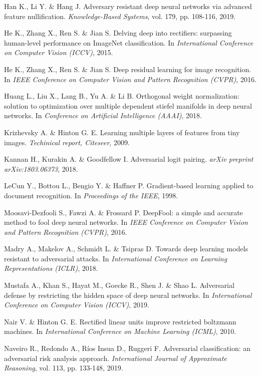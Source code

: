 \documentclass[preprint,review,12pt]{elsarticle}
\numberwithin{equation}{section}
\begin{document}
\begin{thebibliography}{99}
Han K., Li Y. \& Hang J.
Adversary resistant deep neural networks via advanced feature nullification.
\textit{Knowledge-Based Systems}, vol. 179, pp. 108-116, 2019.

He K., Zhang X., Ren S. \&  Jian S.
Delving deep into rectifiers: surpassing human-level performance on ImageNet classification.
In \textit{International Conference on Computer Vision (ICCV)}, 2015.

He K., Zhang X., Ren S. \&  Jian S.
Deep residual learning for image recognition.
In \textit{IEEE Conference on Computer Vision and Pattern Recognition (CVPR)}, 2016.

Huang L., Liu X., Lang B., Yu A. \& Li B.
Orthogonal weight normalization: solution to optimization over multiple
dependent stiefel manifolds in deep neural networks.
In \textit{Conference on Artificial Intelligence (AAAI)}, 2018.

Krizhevsky A. \&  Hinton G. E.
Learning multiple layers of features from tiny images.
\textit{Techinical report, Citeseer}, 2009.

Kannan H., Kurakin A. \& Goodfellow I.
Adversarial logit pairing.
\textit{arXiv preprint arXiv:1803.06373}, 2018.

LeCun Y., Bottou L., Bengio Y. \&  Haffner P.
Gradient-based learning applied to document recognition.
In \textit{Proceedings of the IEEE}, 1998.

Moosavi-Dezfooli S., Fawzi A. \&  Frossard P.
DeepFool: a simple and accurate method to fool deep neural networks.
In \textit{IEEE Conference on Computer Vision and Pattern Recognition (CVPR)}, 2016.

Madry A., Makelov A., Schmidt L. \& Tsipras D.
Towards deep learning models resistant to adversarial attacks.
In \textit{ International Conference on Learning Representations (ICLR)}, 2018.

Mustafa  A., Khan  S., Hayat M., Goecke R., Shen J. \&  Shao  L.
Adversarial defense by restricting the hidden space of deep neural networks.
In \textit{International Conference on Computer Vision (ICCV)}, 2019.

Nair V. \& Hinton G. E.
Rectified linear units improve restricted boltzmann machines.
In \textit{International Conference on Machine Learning (ICML)}, 2010.

Naveiro R., Redondo A., R\'{i}os Insua D., Ruggeri F.
Adversarial classification: an adversarial risk analysis approach.
\textit{International Journal of Approximate Reasoning}, vol. 113, pp. 133-148, 2019.


\end{thebibliography}
\end{document}
